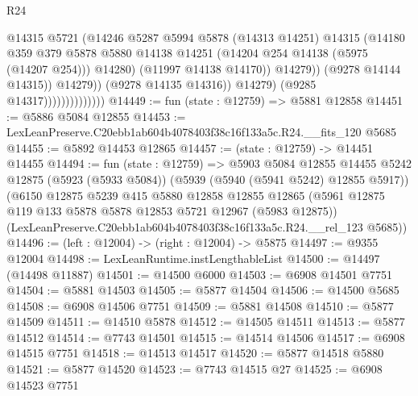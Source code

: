\begin{lexlean}{R24}
\begin{coremodule}
                                            @14315
                                            @5721
                                            (@14246
                                              @5287
                                              @5994
                                              @5878
                                              (@14313 @14251)
                                              @14315
                                              (@14180
                                                @359
                                                @379
                                                @5878
                                                @5880
                                                @14138
                                                @14251
                                                (@14204 @254 @14138 (@5975 (@14207 @254)))
                                                @14280)
                                              (@11997 @14138 @14170))
                                            @14279))
                                        (@9278 @14144 @14315))
                                      @14279))
                                  (@9278 @14135 @14316))
                                @14279)
                              (@9285 @14317))))))))))))))
@14449 := fun (state : @12759) => @5881 @12858
@14451 := @5886 @5084 @12855
@14453 := LexLeanPreserve.C20ebb1ab604b4078403f38c16f133a5c.R24.__fits_120 @5685
@14455 := @5892 @14453 @12865
@14457 := (state : @12759) -> @14451 @14455
@14494 := fun (state : @12759) =>
  @5903
    @5084
    @12855
    @14455
    @5242
    @12875
    (@5923 (@5933 @5084))
    (@5939 (@5940 (@5941 @5242) @12855 @5917))
    (@6150
      @12875
      @5239
      @415
      @5880
      @12858
      @12855
      @12865
      (@5961 @12875 @119 @133 @5878 @5878 @12853 @5721 @12967 (@5983 @12875))
      (LexLeanPreserve.C20ebb1ab604b4078403f38c16f133a5c.R24.__rel_123 @5685))
@14496 := (left : @12004) -> (right : @12004) -> @5875
@14497 := @9355 @12004
@14498 := LexLeanRuntime.instLengthableList
@14500 := @14497 (@14498 @11887)
@14501 := @14500 @6000
@14503 := @6908 @14501 @7751
@14504 := @5881 @14503
@14505 := @5877 @14504
@14506 := @14500 @5685
@14508 := @6908 @14506 @7751
@14509 := @5881 @14508
@14510 := @5877 @14509
@14511 := @14510 @5878
@14512 := @14505 @14511
@14513 := @5877 @14512
@14514 := @7743 @14501
@14515 := @14514 @14506
@14517 := @6908 @14515 @7751
@14518 := @14513 @14517
@14520 := @5877 @14518 @5880
@14521 := @5877 @14520
@14523 := @7743 @14515 @27
@14525 := @6908 @14523 @7751

\end{coremodule}
\end{lexlean}
